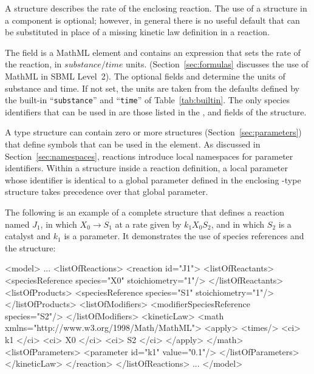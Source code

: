 \documentclass[10pt,twocolumntoc]{cekarticle}
\newcommand{\vref}[1]{\ref{#1}}
\begin{document}
A  structure describes the rate of the enclosing
reaction.  The use of a  structure in a 
component is optional; however, in general there is no useful default that
can be substituted in place of a missing kinetic law definition in a
reaction.

The field  is a MathML element and contains an expression that
sets the rate of the reaction, in $substance/time$ units.
(Section~\ref{sec:formulas} discusses the use of MathML in SBML Level~2).
The optional fields  and 
determine the units of substance and time.  If not set, the units are taken
from the defaults defined by the built-in ``\texttt{substance}'' and
``\texttt{time}'' of Table~\vref{tab:builtin}.  The only species
identifiers that can be used in  are those listed in the
,  and  fields of the
 structure.

A  type structure can contain zero or more
 structures (Section~\ref{sec:parameters}) that
define symbols that can be used in the  element.  As
discussed in Section~\ref{sec:namespaces}, reactions introduce
local namespaces for parameter identifiers.  Within a
 structure inside a reaction definition, a local
parameter whose identifier is identical to a global parameter
defined in the enclosing -type structure takes
precedence over that global parameter.

The following is an example of a complete  structure that
defines a reaction named $J_1$, in which $X_0 \longrightarrow S_1$ at a
rate given by $k_1 X_0 S_2$, and in which $S_2$ is a catalyst and $k_1$ is
a parameter.  It demonstrates the use of species references and the
 structure:
\begin{example}
<model>
    ...
    <listOfReactions>
        <reaction id="J1">
            <listOfReactants>
                <speciesReference species="X0" stoichiometry="1"/>
            </listOfReactants>
            <listOfProducts>
                <speciesReference species="S1" stoichiometry="1"/>
            </listOfProducts>
            <listOfModifiers>
                <modifierSpeciesReference species="S2"/>
            </listOfModifiers>
            <kineticLaw>
                <math xmlns="http://www.w3.org/1998/Math/MathML">
                    <apply>
                        <times/>
                        <ci> k1 </ci>
                        <ci> X0 </ci>
                        <ci> S2 </ci>
                    </apply>
                </math>
                <listOfParameters>
                    <parameter id="k1" value="0.1"/>
                </listOfParameters>
            </kineticLaw>
        </reaction>
    </listOfReactions>
    ...
</model>
\end{example}
\end{document}
